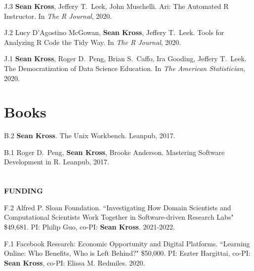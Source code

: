 \begin{bibenum}

\item[J.3] \textbf{Sean Kross}, Jeffery T.\ Leek, John Muschelli.
Ari: The Automated R Instructor. 
In \emph{The R Journal}, 2020.

\item[J.2] Lucy D'Agostino McGowan, \textbf{Sean Kross}, Jeffery T.\ Leek.
Tools for Analyzing R Code the Tidy Way. 
In \emph{The R Journal}, 2020.

\item[J.1] \textbf{Sean Kross}, Roger D.\ Peng, Brian S.\ Caffo, Ira Gooding,
Jeffery T.\ Leek. The Democratization of Data Science Education. 
In \emph{The American Statistician}, 2020.

\end{bibenum}

\vspace{0.1in}

\section{Books}

\begin{bibenum}

\item[B.2] \textbf{Sean Kross}. The Unix Workbench. Leanpub, 2017.

\item[B.1] Roger D.\ Peng, \textbf{Sean Kross}, Brooke Anderson. Mastering 
Software Development in R. Leanpub, 2017.

\end{bibenum}


\section{} \vspace{0.2in} \textbf{FUNDING} \vspace{0.05in}

\begin{bibenum}

\item[F.2] Alfred P. Sloan Foundation. ``Investigating How Domain Scientists and Computational Scientists Work Together in Software-driven Research Labs" \$49,681. PI: Philip Guo, co-PI: \textbf{Sean Kross}. 2021-2022.

\item[F.1] Facebook Research: Economic Opportunity and Digital Platforms. ``Learning Online: Who Benefits, Who is Left Behind?" \$50,000. PI: Eszter Hargittai, co-PI: \textbf{Sean Kross}, co-PI: Elissa M. Redmiles. 2020.

\end{bibenum}

